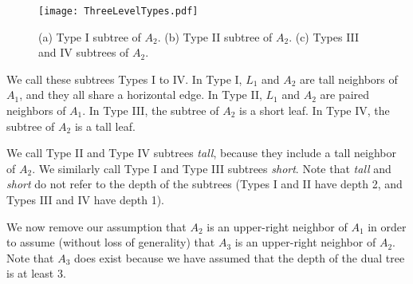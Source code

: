 \documentclass{article}
\begin{document}
		\begin{figure}[htbp] 
			\begin{center}
				\texttt{[image: ThreeLevelTypes.pdf]} 
			\end{center}
			\caption{ 
				(a) Type I subtree of $A_2$.
				(b) Type II subtree of $A_2$. 
				(c) Types III and IV subtrees of $A_2$.
			}
			\label{fig:threeleveltypes}
		\end{figure}

		We call these subtrees Types I to IV.  In Type I, $L_1$ and $A_2$ are tall
		neighbors of $A_1$, and they all share a horizontal edge.
		In Type II, $L_1$ and $A_2$ are paired neighbors of $A_1$.
		In Type III, the subtree of $A_2$ is a short leaf.
		In Type IV, the subtree of $A_2$ is a tall leaf.
		
		We call Type II and Type IV subtrees \emph{tall}, because they include a tall
		neighbor of $A_2$.  We similarly call Type I and Type III subtrees
		\emph{short}.  Note that \emph{tall} and \emph{short} do not refer to the
		depth of the subtrees (Types I and II have depth 2, and Types III and IV have
		depth 1).
		
		We now remove our assumption that $A_2$ is an upper-right neighbor of $A_1$ in
		order to assume (without loss of generality) that $A_3$ is an upper-right
		neighbor of $A_2$.
		Note that $A_3$ does exist because we have assumed that the depth of the dual
		tree is at least 3.
		
\end{document}
